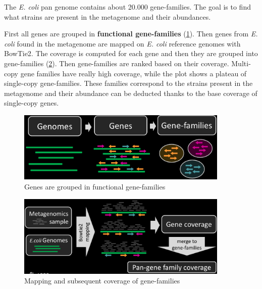 The \emph{E. coli} pan genome contains about 20.000 gene-families. The goal is to find what strains are present in the metagenome and their abundances.

First all genes are grouped in \textbf{functional gene-families} (\ref{fig:pan1}). Then genes from \emph{E. coli} found in the metagenome are mapped on \emph{E. coli} reference genomes with BowTie2. The coverage is computed for each gene and then they are grouped into gene-families (\ref{fig:pan2}). Then gene-families are ranked based on their coverage. Multi-copy gene families have really high coverage, while the plot shows a plateau of single-copy gene-families. These families correspond to the strains present in the metagenome and their abundance can be deducted thanks to the base coverage of single-copy genes. 

\begin{figure}[!h]
\centering
\includegraphics[width=0.9\textwidth]{panphlan1.png}
\caption{\label{fig:pan1}Genes are grouped in functional gene-families}
\end{figure}

\begin{figure}[!h]
\centering
\includegraphics[width=0.9\textwidth]{panphlan2.png}
\caption{\label{fig:pan2}Mapping and subsequent coverage of gene-families}
\end{figure}

